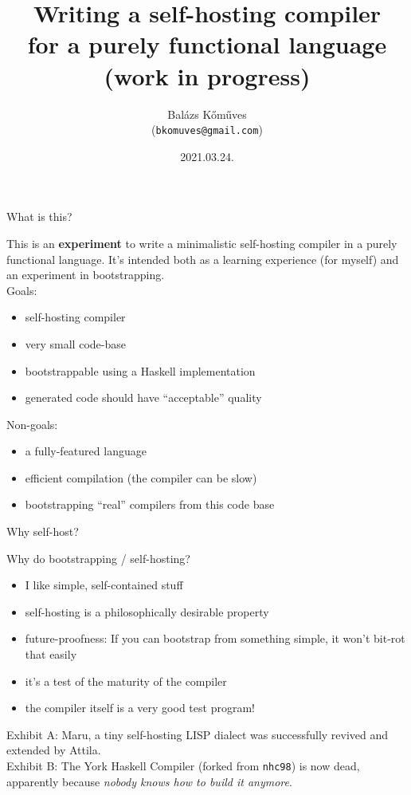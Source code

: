 \documentclass{beamer}
\title{Writing a self-hosting compiler \\ for a purely functional language\\
{\footnotesize (work in progress)}}
\author{Bal\'azs K\H{o}m\H{u}ves \\ {\small ({\tt bkomuves@gmail.com})}}
\date{2021.03.24.}
\begin{document}
\begin{frame}
\titlepage
\end{frame}


\begin{frame}{What is this?}

This is an {\bf experiment} to write a minimalistic self-hosting compiler
in a purely functional language. It's intended both as a learning
experience (for myself) and an experiment in bootstrapping.\\[15pt]

Goals:
\begin{itemize}
\item self-hosting compiler
\item very small code-base
\item bootstrappable using a Haskell implementation
\item generated code should have ``acceptable'' quality \\[15pt]
\end{itemize}

Non-goals:
\begin{itemize}
\item a fully-featured language
\item efficient compilation (the compiler can be slow)
\item bootstrapping ``real'' compilers from this code base
\end{itemize}

\end{frame}


\begin{frame}{Why self-host?}

Why do bootstrapping / self-hosting?\\[10pt]

\begin{itemize}
\item I like simple, self-contained stuff
\item self-hosting is a philosophically desirable property
\item future-proofness: If you can bootstrap from something simple, it won't bit-rot that easily
\item it's a test of the maturity of the compiler
\item the compiler itself is a very good test program! \\[15pt]
\end{itemize}

Exhibit A: Maru, a tiny self-hosting LISP dialect was successfully revived and
extended by Attila.\\[15pt]

Exhibit B: The York Haskell Compiler (forked from {\tt nhc98}) is now dead, apparently
because \emph{nobody knows how to build it anymore}.

\end{frame}
\end{document}
